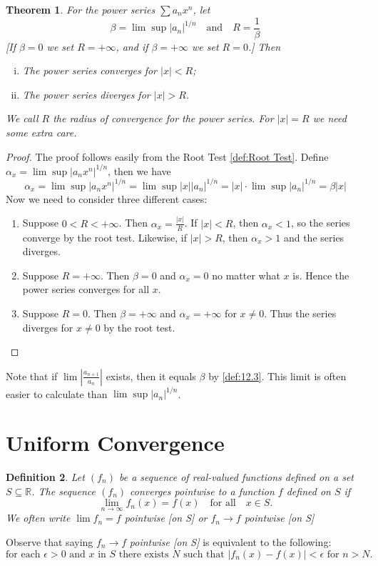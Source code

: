 \documentclass[12pt, lettersize]{book}
\newtheorem{thm}{Theorem}[section]
\newtheorem{dfn}[thm]{Definition}
\newcommand{\R}{\mathbb{R}}
\begin{document}
	\begin{thm}\label{def:23.1}
		For the power series $\sum a_nx^n$, let
		\begin{displaymath}
			\beta=\lim\sup |a_n|^{1/n}\quad\text{and}\quad R=\frac{1}{\beta}
		\end{displaymath}
		[If $\beta=0$ we set $R=+\infty$, and if $\beta=+\infty$ we set $R=0$.] Then
		\begin{enumerate}[(i)]
			\item The power series converges for $|x|<R$;
			\item The power series diverges for $|x|>R$. 
		\end{enumerate}
		We call $R$ the \emph{radius of convergence} for the power series. For $|x|=R$ we need some extra care.
	\end{thm}
	\begin{proof}
		The proof follows easily from the Root Test \ref{def:Root Test}. Define $\alpha_x=\lim\sup|a_nx^n|^{1/n}$, then
		we have 
		\begin{displaymath}
			\alpha_x=\lim\sup|a_nx^n|^{1/n}=\lim\sup|x||a_n|^{1/n}=|x|\cdot\lim\sup|a_n|^{1/n}=\beta|x|
		\end{displaymath}
		Now we need to consider three different cases:
		\begin{enumerate}
			\item Suppose $0<R<+\infty$. Then $\alpha_x=\frac{|x|}{R}$. If $|x|<R$, then $\alpha_x<1$, so the series
			converge by the root test. Likewise, if $|x|>R$, then $\alpha_x>1$ and the series diverges.
			\item Suppose $R=+\infty$. Then $\beta=0$ and $\alpha_x=0$ no matter what $x$ is. Hence the power series
			converges for all $x$.
			\item Suppose $R=0$. Then $\beta=+\infty$ and $\alpha_x=+\infty$ for $x\neq0$. Thus the series diverges for
			$x\neq0$ by the root test.
		\end{enumerate}
	\end{proof}
	Note that if $\lim\left|\frac{a_{n+1}}{a_n}\right|$ exists, then it equals $\beta$ by \ref{def:12.3}. This limit
	is often easier to calculate than $\lim\sup|a_n|^{1/n}$.
	\newpage
	\section{Uniform Convergence}
	\begin{dfn}
		Let $(f_n)$ be a sequence of real-valued functions defined on a set $S\subseteq\R$. The sequence $(f_n)$ \emph{converges pointwise} to a function $f$ defined on $S$ if
		\begin{displaymath}
			\lim\limits_{n\rightarrow\infty}f_n(x)=f(x)\quad\text{for all}\quad x\in S.
		\end{displaymath}
		We often write $\lim f_n=f$ \emph{pointwise [on S]} or $f_n\rightarrow f$ \emph{pointwise [on S]}
	\end{dfn}
	Observe that saying $f_n\rightarrow f$ \emph{pointwise [on S]} is equivalent to the following:
	\begin{displaymath}
		\text{for each $\epsilon>0$ and $x$ in $S$ there exists $N$ such that $|f_n(x)-f(x)|<\epsilon$ for $n>N$.}
	\end{displaymath}
	
\end{document}
